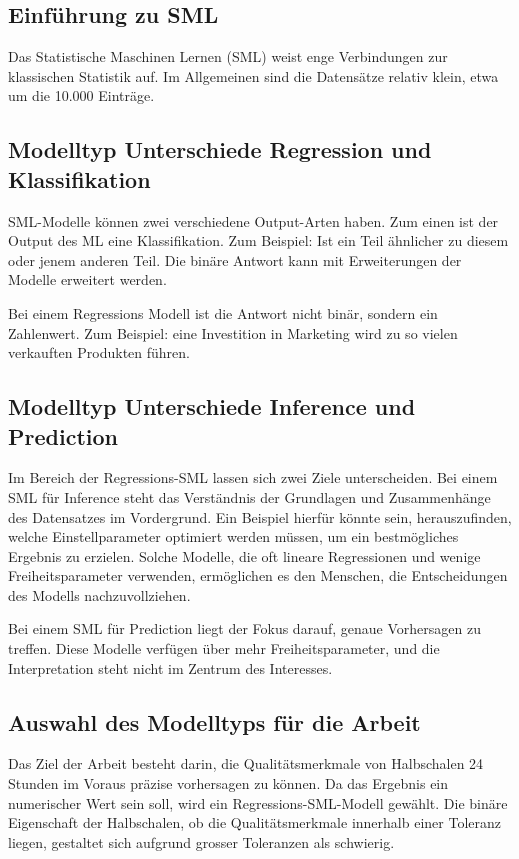 \subsection{Einführung zu SML}
Das Statistische Maschinen Lernen (SML) weist enge Verbindungen zur klassischen Statistik auf. Im Allgemeinen sind die Datensätze relativ klein, etwa um die 10.000 Einträge.

\subsection{Modelltyp Unterschiede Regression und Klassifikation}
SML-Modelle können zwei verschiedene Output-Arten haben. Zum einen ist der Output des ML eine Klassifikation. Zum Beispiel: Ist ein Teil ähnlicher zu diesem oder jenem anderen Teil. Die binäre Antwort kann mit Erweiterungen der Modelle erweitert werden.

Bei einem Regressions Modell ist die Antwort nicht binär, sondern ein Zahlenwert. Zum Beispiel: eine Investition in Marketing wird zu so vielen verkauften Produkten führen.

\subsection{Modelltyp Unterschiede Inference und  Prediction}
Im Bereich der Regressions-SML lassen sich zwei Ziele unterscheiden. Bei einem SML für Inference steht das Verständnis der Grundlagen und Zusammenhänge des Datensatzes im Vordergrund. Ein Beispiel hierfür könnte sein, herauszufinden, welche Einstellparameter optimiert werden müssen, um ein bestmögliches Ergebnis zu erzielen. Solche Modelle, die oft lineare Regressionen und wenige Freiheitsparameter verwenden, ermöglichen es den Menschen, die Entscheidungen des Modells nachzuvollziehen.

Bei einem SML für Prediction liegt der Fokus darauf, genaue Vorhersagen zu treffen. Diese Modelle verfügen über mehr Freiheitsparameter, und die Interpretation steht nicht im Zentrum des Interesses.

\subsection{Auswahl des Modelltyps für die Arbeit}
Das Ziel der Arbeit besteht darin, die Qualitätsmerkmale von Halbschalen 24 Stunden im Voraus präzise vorhersagen zu können. Da das Ergebnis ein numerischer Wert sein soll, wird ein Regressions-SML-Modell gewählt. Die binäre Eigenschaft der Halbschalen, ob die Qualitätsmerkmale innerhalb einer Toleranz liegen, gestaltet sich aufgrund grosser Toleranzen als schwierig. \cite{MAGew}


